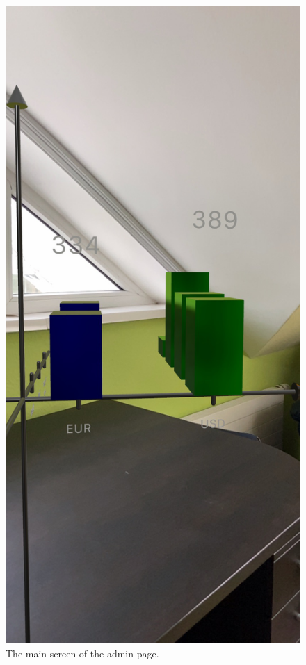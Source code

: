 \documentclass[11pt,a4paper,oneside]{report}
\begin{document}
\begin{figure}[!ht]
  \centering
  \includegraphics[scale=0.2]{front.jpeg}
  \caption{The main screen of the admin page.}
  \label{fig:TexnicCenter}
\end{figure}
\end{document}
